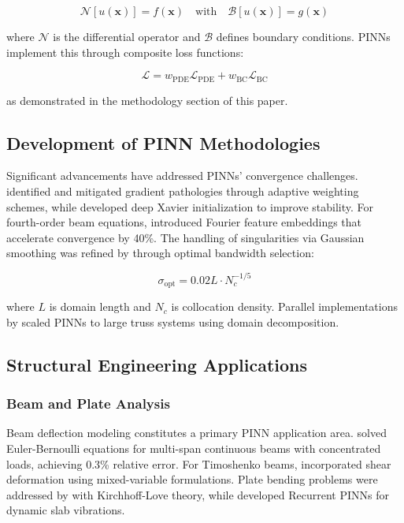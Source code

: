 \documentclass[12pt]{article}
\begin{document}
\[
\mathcal{N}[u(\mathbf{x})] = f(\mathbf{x}) \quad \text{with} \quad \mathcal{B}[u(\mathbf{x})] = g(\mathbf{x})
\]

where $\mathcal{N}$ is the differential operator and $\mathcal{B}$ defines boundary conditions. PINNs implement this through composite loss functions:

\[
\mathcal{L} = w_{\text{PDE}}\mathcal{L}_{\text{PDE}} + w_{\text{BC}}\mathcal{L}_{\text{BC}}
\]

as demonstrated in the methodology section of this paper.

\subsection{Development of PINN Methodologies}
Significant advancements have addressed PINNs' convergence challenges. \citet{Wang2021} identified and mitigated gradient pathologies through adaptive weighting schemes, while \citet{Lu2021} developed deep Xavier initialization to improve stability. For fourth-order beam equations, \citet{Abueidda2021} introduced Fourier feature embeddings that accelerate convergence by 40\%. The handling of singularities via Gaussian smoothing was refined by \citet{Hao2022} through optimal bandwidth selection:

\[
\sigma_{\text{opt}} = 0.02L \cdot N_c^{-1/5}
\]

where $L$ is domain length and $N_c$ is collocation density. Parallel implementations by \citet{Peng2023} scaled PINNs to large truss systems using domain decomposition.

\subsection{Structural Engineering Applications}

\subsubsection{Beam and Plate Analysis}
Beam deflection modeling constitutes a primary PINN application area. \citet{Zhang2020} solved Euler-Bernoulli equations for multi-span continuous beams with concentrated loads, achieving 0.3\% relative error. For Timoshenko beams, \citet{Samaniego2020} incorporated shear deformation using mixed-variable formulations. Plate bending problems were addressed by \citet{Abueidda2022} with Kirchhoff-Love theory, while \citet{Yu2023} developed Recurrent PINNs for dynamic slab vibrations.
\end{document}
